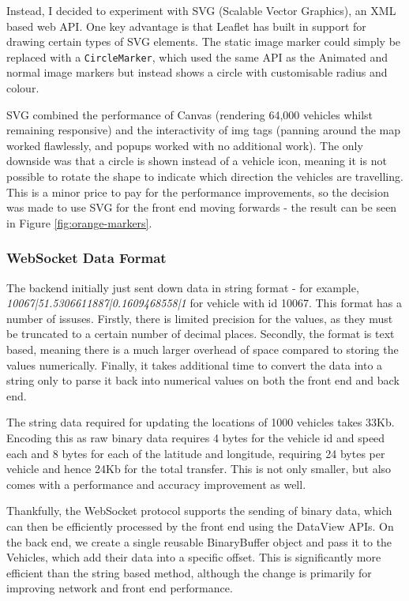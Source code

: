 \documentclass[ %
                    author={Alexander Hill},
                supervisor={Dr. Benjamin Sach},
                    degree={MEng},
                     title={MARMOSET},
                  subtitle={Multi-Agent Route Management using Online Simulation for Efficient Transportation},
                      type={research},
                      year={2016} ]{dissertation}
\begin{document}
Instead, I decided to experiment with SVG (Scalable Vector Graphics), an XML
based web API. One key advantage is that Leaflet has built in support for
drawing certain types of SVG elements. The static image marker could simply be
replaced with a \texttt{CircleMarker}, which used the same API as the Animated
and normal image markers but instead shows a circle with customisable radius and
colour.

SVG combined the performance of Canvas (rendering 64,000 vehicles
whilst remaining responsive) and the interactivity of img tags (panning around
the map worked flawlessly, and popups worked with no additional work). The only
downside was that a circle is shown instead of a vehicle icon, meaning it is
not possible to rotate the shape to indicate which direction the vehicles are
travelling. This is a minor price to pay for the performance improvements, so
the decision was made to use SVG for the front end moving forwards - the result
can be seen in Figure \ref{fig:orange-markers}.

\subsubsection{WebSocket Data Format}

The backend initially just sent down data in string format - for example,
\textit{10067|51.5306611887|0.1609468558|1} for vehicle with id 10067. This
format has a number of issuses. Firstly, there is limited precision for the
values, as they must be truncated to a certain number of decimal places.
Secondly, the format is text based, meaning there is a much larger overhead of
space compared to storing the values numerically. Finally, it takes additional
time to convert the data into a string only to parse it back into numerical
values on both the front end and back end.

The string data required for updating the locations of 1000 vehicles takes 33Kb.
Encoding this as raw binary data requires
4 bytes for the vehicle id and speed each and 8 bytes for each of the latitude and
longitude, requiring 24 bytes per vehicle and hence 24Kb for the total transfer.
This is not only smaller, but also comes with a performance and accuracy
improvement as well.

Thankfully, the WebSocket protocol supports the sending of binary data, which
can then be efficiently processed by the front end using the DataView APIs. On
the back end, we create a single reusable BinaryBuffer object and pass it to the
Vehicles, which add their data into a specific offset. This is significantly
more efficient than the string based method, although the change is primarily
for improving network and front end performance.
\end{document}
